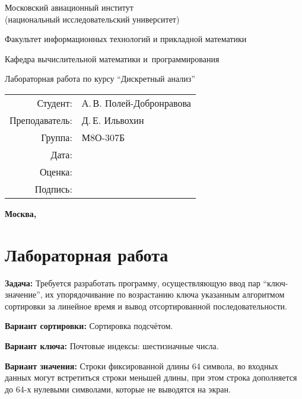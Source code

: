 \documentclass[pdf, unicode, 12pt, a4paper,oneside,fleqn]{article}
\newcommand{\CWHeader}[1]{\section*{#1}}
\newcommand{\CWProblem}[1]{\par\textbf{Задача: }#1}
\begin{document}
\begin{titlepage}
\begin{center}
\bfseries

{\Large Московский авиационный институт\\ (национальный исследовательский университет)

}

\vspace{48pt}

{\large Факультет информационных технологий и прикладной математики
}

\vspace{36pt}

{\large Кафедра вычислительной математики и~программирования

}


\vspace{48pt}

Лабораторная работа  по курсу \enquote{Дискретный анализ}

\end{center}

\vspace{72pt}

\begin{flushright}
\begin{tabular}{rl}
Студент: & А.\,В. Полей-Добронравова \\
Преподаватель: & Д.\,Е. Ильвохин \\
Группа: & М8О-307Б \\
Дата: & \\
Оценка: & \\
Подпись: & \\
\end{tabular}
\end{flushright}

\vfill

\begin{center}
\bfseries
Москва, \the\year
\end{center}
\end{titlepage}

\pagebreak

\CWHeader{Лабораторная работа }

\CWProblem{
Требуется разработать программу, осуществляющую ввод пар \enquote{ключ-значение}, их 
упорядочивание по возрастанию ключа указанным алгоритмом сортировки за линейное время и вывод отсортированной последовательности.

{\bfseries Вариант сортировки:} Сортировка подсчётом.

{\bfseries Вариант ключа:} { \normalfont\ttfamily Почтовые индексы: шестизначные числа. }

{\bfseries Вариант значения:} { \normalfont\ttfamily Строки фиксированной длины 64 символа, во входных данных могут встретиться строки меньшей длины, при этом строка дополняется до 64-х нулевыми символами, которые не выводятся на экран.}
}
\pagebreak
\end{document}
